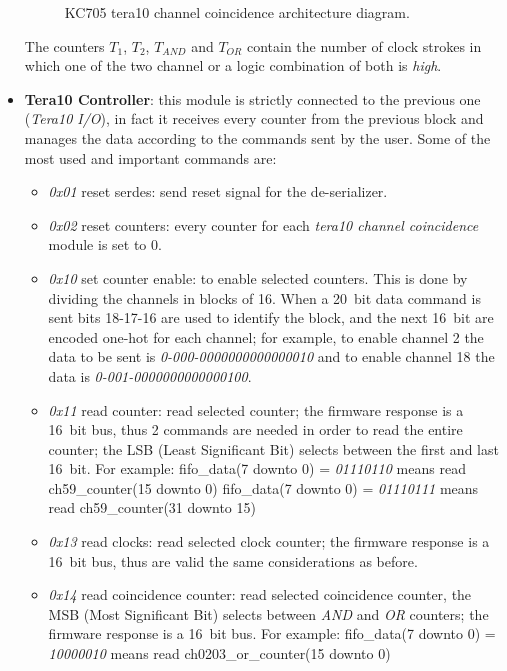 \begin{itemize}
\begin{figure}[H]
		\caption{KC705 tera10 channel coincidence architecture diagram.}
		\label{fig:coincidence}
	\end{figure}
	\noindent The counters $T_{1}$, $T_{2}$, $T_{AND}$ and $T_{OR}$ contain the number of clock strokes in which one of the two channel or a logic combination of both is \textit{high}.
	\item \textbf{Tera10 Controller}: this module is strictly connected to the previous one (\textit{Tera10 I/O}), in fact it receives every counter from the previous block and manages the data according to the commands sent by the user. Some of the most used and important commands are:
	\begin{itemize}
		\item \textit{0x01} reset serdes: send reset signal for the de-serializer.
		\item \textit{0x02} reset counters: every counter for each \textit{tera10 channel coincidence} module is set to 0.
		\item \textit{0x10} set counter enable: to enable selected counters. This is done by dividing the channels in blocks of 16. When a 20~bit data command is sent bits 18-17-16 are used to identify the block, and the next 16~bit are encoded one-hot for each channel; for example, to enable channel 2 the data to be sent is \textit{0-000-0000000000000010} and to enable channel 18 the data is \textit{0-001-0000000000000100}.   
		\item \textit{0x11} read counter: read selected counter; the firmware response is a 16~bit bus, thus 2 commands are needed in order to read the entire counter; the LSB (Least Significant Bit) selects between the first and last 16~bit. For example:
		\newline
		fifo\_data(7 downto 0) = \textit{01110110} means read ch59\_counter(15 downto 0)
		\newline
		fifo\_data(7 downto 0) = \textit{01110111} means read ch59\_counter(31 downto 15)
		\item \textit{0x13} read clocks: read selected clock counter; the firmware response is a 16~bit bus, thus are valid the same considerations as before.
		\item \textit{0x14} read coincidence counter: read selected coincidence counter, the MSB (Most Significant Bit) selects between \textit{AND} and \textit{OR} counters; the firmware response is a 16~bit bus. For example:
		\newline
		fifo\_data(7 downto 0) = \textit{10000010} means read ch0203\_or\_counter(15 downto 0)

\end{itemize}
\end{itemize}
